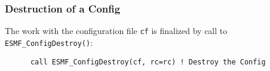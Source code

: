 
  \subsubsection{Destruction of a Config}
 
   The work with the configuration file {\tt cf} is finalized by call to
   {\tt ESMF\_ConfigDestroy()}: 

 \begin{verbatim}
      call ESMF_ConfigDestroy(cf, rc=rc) ! Destroy the Config
 
\end{verbatim}

\setlength{\parskip}{\oldparskip}
\setlength{\parindent}{\oldparindent}
\setlength{\baselineskip}{\oldbaselineskip}
